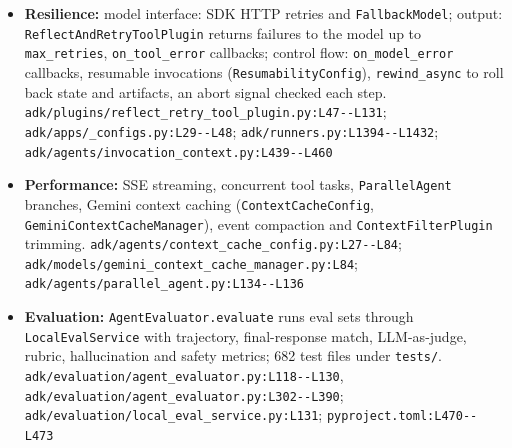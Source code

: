 \begin{itemize}
\item \textbf{Resilience:} model interface: SDK HTTP retries and \texttt{FallbackModel}; output: \texttt{ReflectAndRetryToolPlugin} returns failures to the model up to \texttt{max\_\allowbreak{}retries}, \texttt{on\_\allowbreak{}tool\_\allowbreak{}error} callbacks; control flow: \texttt{on\_\allowbreak{}model\_\allowbreak{}error} callbacks, resumable invocations (\texttt{ResumabilityConfig}), \texttt{rewind\_\allowbreak{}async} to roll back state and artifacts, an abort signal checked each step. \texttt{adk/\allowbreak{}plugins/\allowbreak{}reflect\_\allowbreak{}retry\_\allowbreak{}tool\_\allowbreak{}plugin.\allowbreak{}py:\allowbreak{}L47-\allowbreak{}-\allowbreak{}L131}; \texttt{adk/\allowbreak{}apps/\allowbreak{}\_\allowbreak{}configs.\allowbreak{}py:\allowbreak{}L29-\allowbreak{}-\allowbreak{}L48}; \texttt{adk/\allowbreak{}runners.\allowbreak{}py:\allowbreak{}L1394-\allowbreak{}-\allowbreak{}L1432}; \texttt{adk/\allowbreak{}agents/\allowbreak{}invocation\_\allowbreak{}context.\allowbreak{}py:\allowbreak{}L439-\allowbreak{}-\allowbreak{}L460}
\item \textbf{Performance:} SSE streaming, concurrent tool tasks, \texttt{ParallelAgent} branches, Gemini context caching (\texttt{ContextCacheConfig}, \texttt{GeminiContextCacheManager}), event compaction and \texttt{ContextFilterPlugin} trimming. \texttt{adk/\allowbreak{}agents/\allowbreak{}context\_\allowbreak{}cache\_\allowbreak{}config.\allowbreak{}py:\allowbreak{}L27-\allowbreak{}-\allowbreak{}L84}; \texttt{adk/\allowbreak{}models/\allowbreak{}gemini\_\allowbreak{}context\_\allowbreak{}cache\_\allowbreak{}manager.\allowbreak{}py:\allowbreak{}L84}; \texttt{adk/\allowbreak{}agents/\allowbreak{}parallel\_\allowbreak{}agent.\allowbreak{}py:\allowbreak{}L134-\allowbreak{}-\allowbreak{}L136}
\item \textbf{Evaluation:} \texttt{AgentEvaluator.\allowbreak{}evaluate} runs eval sets through \texttt{LocalEvalService} with trajectory, final-response match, LLM-as-judge, rubric, hallucination and safety metrics; 682 test files under \texttt{tests/\allowbreak{}}. \texttt{adk/\allowbreak{}evaluation/\allowbreak{}agent\_\allowbreak{}evaluator.\allowbreak{}py:\allowbreak{}L118-\allowbreak{}-\allowbreak{}L130}, \texttt{adk/\allowbreak{}evaluation/\allowbreak{}agent\_\allowbreak{}evaluator.\allowbreak{}py:\allowbreak{}L302-\allowbreak{}-\allowbreak{}L390}; \texttt{adk/\allowbreak{}evaluation/\allowbreak{}local\_\allowbreak{}eval\_\allowbreak{}service.\allowbreak{}py:\allowbreak{}L131}; \texttt{pyproject.\allowbreak{}toml:\allowbreak{}L470-\allowbreak{}-\allowbreak{}L473}
\end{itemize}

